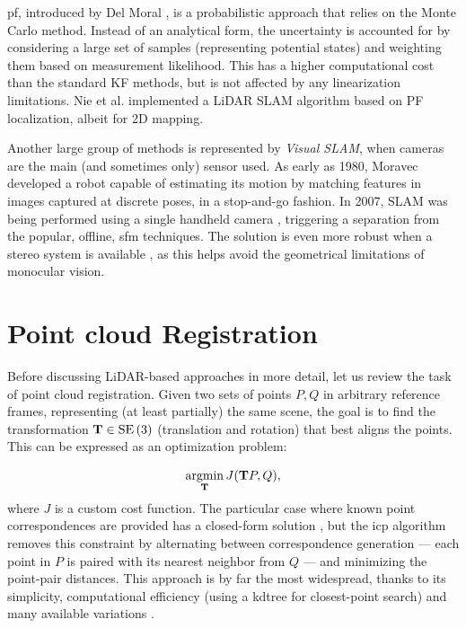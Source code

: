 \acrfull{pf}, introduced by Del Moral \cite{del1997nonlinear}, is a probabilistic approach that relies on the Monte Carlo method. Instead of an analytical form, the uncertainty is accounted for by considering a large set of samples (representing potential states) and weighting them based on measurement likelihood. This has a higher computational cost than the standard KF methods, but is not affected by any linearization limitations. Nie et al. \cite{lcpf2020} implemented a LiDAR SLAM algorithm based on PF localization, albeit for 2D mapping.

Another large group of methods is represented by \emph{Visual SLAM}, when cameras are the main (and sometimes only) sensor used. As early as 1980, Moravec \cite{moravec1980obstacle} developed a robot capable of estimating its motion by matching features in images captured at discrete poses, in a stop-and-go fashion. In 2007, SLAM was being performed using a single handheld camera \cite{davison2007monoslam,klein2007parallel}, triggering a separation from the popular, offline, \gls{sfm} techniques. The solution is even more robust when a stereo system is available \cite{mei2011rslam}, as this helps avoid the geometrical limitations of monocular vision.

\section{Point cloud Registration}

Before discussing LiDAR-based approaches in more detail, let us review the task of point cloud registration. Given two sets of points $P, Q$ in arbitrary reference frames, representing (at least partially) the same scene, the goal is to find the transformation \mbox{$\mathbf{T} \in \operatorname{SE}\left(3\right)$} (translation and rotation) that best aligns the points. This can be expressed as an optimization problem:

\begin{equation}
    \underset{\mathbf{T}}{\operatorname{argmin}}\,J(\mathbf{T}P, Q)\text{,}
\end{equation}
where $J$ is a custom cost function. The particular case where known point correspondences are provided has a closed-form solution \cite{arun1987leastsquares}, but the \acrfull{icp} algorithm \cite{besl1992method} removes this constraint by alternating between correspondence generation --- each point in $P$ is paired with its nearest neighbor from $Q$ --- and minimizing the point-pair distances. This approach is by far the most widespread, thanks to its simplicity, computational efficiency (\eg using a \gls{kdtree} for closest-point search) and many available variations \cite{rusinkiewicz2001efficient,huang2021comprehensivesurveypointcloud}.

